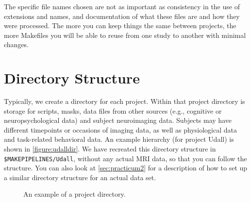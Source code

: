 The specific file names chosen are not as important as consistency in the use of extensions and names, and documentation of what these files are and how they were processed. The more you can keep things the same between projects, the more Makefiles you will be able to reuse from one study to another with minimal changes. 

\section{Directory Structure}
\label{sec:dir}

Typically, we create a directory for each project. Within that project directory is storage for scripts, masks, data files from other sources (e.g., cognitive or neuropsychological data) and subject neuroimaging data. Subjects may have different timepoints or occasions of imaging data, as well as physiological data and task-related behavioral data.
An example hierarchy (for project Udall) is shown in \autoref{figure:udalldir}. We have recreated this directory structure in \texttt{\$MAKEPIPELINES/Udall}, without any actual MRI data, so that you can follow the structure. You can also look at \autoref{sec:practicum2} for a description of how to set up a similar directory structure for an actual data set.

\begin{center}
	\begin{figure}[h!]
		\caption{An example of a project directory.}
		\label{figure:udalldir}
	\end{figure}
\end{center}

